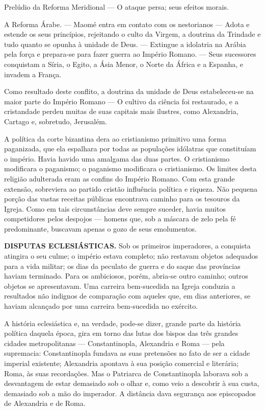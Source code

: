 \documentclass[11pt,a5paper,twoside,openany]{book}
\begin{document}
Prelúdio da Reforma Meridional — O ataque persa; seus efeitos morais.

A Reforma Árabe. — Maomé entra em contato com os nestorianos — Adota e estende os seus princípios, rejeitando o culto da Virgem, a doutrina da Trindade e tudo quanto se opunha à unidade de Deus. — Extingue a idolatria na Arábia pela força e prepara-se para fazer guerra ao Império Romano. — Seus sucessores conquistam a Síria, o Egito, a Ásia Menor, o Norte da África e a Espanha, e invadem a França.

Como resultado deste conflito, a doutrina da unidade de Deus estabeleceu-se na maior parte do Império Romano — O cultivo da ciência foi restaurado, e a cristandade perdeu muitas de suas capitais mais ilustres, como Alexandria, Cartago e, sobretudo, Jerusalém.

\par\medskip\noindent\hrulefill\par\medskip
A política da corte bizantina dera ao cristianismo primitivo uma forma paganizada, que ela espalhara por todas as populações idólatras que constituíam o império. Havia havido uma amalgama das duas partes. O cristianismo modificara o paganismo; o paganismo modificara o cristianismo. Os limites desta religião adulterada eram as confins do Império Romano. Com esta grande extensão, sobreviera ao partido cristão influência política e riqueza. Não pequena porção das vastas receitas públicas encontrava caminho para os tesouros da Igreja. Como em tais circunstâncias deve sempre suceder, havia muitos competidores pelos despojos — homens que, sob a máscara de zelo pela fé predominante, buscavam apenas o gozo de seus emolumentos.

\textbf{DISPUTAS ECLESIÁSTICAS.} Sob os primeiros imperadores, a conquista atingira o seu culme; o império estava completo; não restavam objetos adequados para a vida militar; os dias da peculato de guerra e do saque das províncias haviam terminado. Para os ambiciosos, porém, abria-se outro caminho; outros objetos se apresentavam. Uma carreira bem-sucedida na Igreja conduzia a resultados não indignos de comparação com aqueles que, em dias anteriores, se haviam alcançado por uma carreira bem-sucedida no exército.

A história eclesiástica e, na verdade, pode-se dizer, grande parte da história política daquela época, gira em torno das lutas dos bispos das três grandes cidades metropolitanas — Constantinopla, Alexandria e Roma — pela supremacia: Constantinopla fundava as suas pretensões no fato de ser a cidade imperial existente; Alexandria apontava à sua posição comercial e literária; Roma, às suas recordações. Mas o Patriarca de Constantinopla laborava sob a desvantagem de estar demasiado sob o olhar e, como veio a descobrir à sua custa, demasiado sob a mão do imperador. A distância dava segurança aos episcopados de Alexandria e de Roma.
\end{document}
